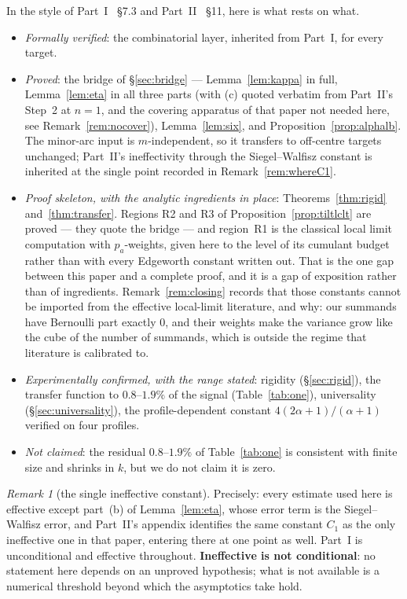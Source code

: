 \documentclass[11pt,a4paper]{article}
\theoremstyle{plain}
\theoremstyle{definition}
\theoremstyle{remark}
\newtheorem{remark}[theorem]{Remark}
\newcommand{\Xref}[3]{#3}
\begin{document}
In the style of Part~I~\cite{P1} \S\Xref{paper}{sec:achieved}{7.3} and
Part~II~\cite{P2} \S\Xref{paper2}{sec:remains}{11}, here is what rests on what.

\begin{itemize}
\item \emph{Formally verified}: the combinatorial layer, inherited from Part~I, for every
      target.
\item \emph{Proved}: the bridge of \S\ref{sec:bridge} --- Lemma~\ref{lem:kappa} in full,
      Lemma~\ref{lem:eta} in all three parts (with (c) quoted verbatim from Part~II's Step~2
      at $n=1$, and the covering apparatus of that paper not needed here, see
      Remark~\ref{rem:nocover}), Lemma~\ref{lem:six}, and Proposition~\ref{prop:alphalb}.
      The minor-arc input is $m$-independent, so it transfers to off-centre targets unchanged;
      Part~II's ineffectivity through the Siegel--Walfisz constant is inherited at the single
      point recorded in Remark~\ref{rem:whereC1}.
\item \emph{Proof skeleton, with the analytic ingredients in place}:
      Theorems~\ref{thm:rigid} and~\ref{thm:transfer}. Regions R2 and R3 of
      Proposition~\ref{prop:tiltlclt} are proved --- they quote the bridge --- and region~R1
      is the classical local limit computation with $p_a$-weights, given here to the level of
      its cumulant budget rather than with every Edgeworth constant written out. That is the
      one gap between this paper and a complete proof, and it is a gap of exposition rather
      than of ingredients. Remark~\ref{rem:closing} records that those constants cannot be
      imported from the effective local-limit literature, and why: our summands have
      Bernoulli part exactly $0$, and their weights make the variance grow like the cube of
      the number of summands, which is outside the regime that literature is calibrated to.
\item \emph{Experimentally confirmed, with the range stated}: rigidity
      (\S\ref{sec:rigid}), the transfer function to $0.8$--$1.9\%$ of the signal
      (Table~\ref{tab:one}), universality (\S\ref{sec:universality}), the profile-dependent
      constant $4(2\alpha+1)/(\alpha+1)$ verified on four profiles.
\item \emph{Not claimed}: the residual $0.8$--$1.9\%$ of Table~\ref{tab:one} is consistent
      with finite size and shrinks in $k$, but we do not claim it is zero.
\end{itemize}

\begin{remark}[the single ineffective constant]\label{rem:oneconstant}
Precisely: every estimate used here is effective except part~(b) of Lemma~\ref{lem:eta}, whose
error term is the Siegel--Walfisz error, and Part~II's appendix identifies the same constant
$C_1$ as the only ineffective one in that paper, entering there at one point as well. Part~I
is unconditional and effective throughout. \textbf{Ineffective is not conditional}: no
statement here depends on an unproved hypothesis; what is not available is a numerical
threshold beyond which the asymptotics take hold.
\end{remark}
\end{document}
